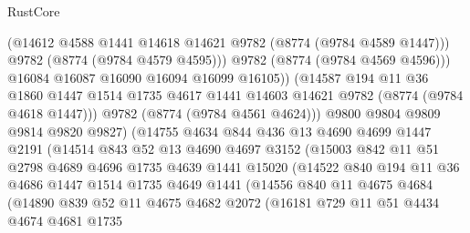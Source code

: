 \begin{lexlean}{RustCore}
\begin{coremodule}
                          (@14612 @4588 @1441 @14618 @14621 @9782 (@8774 (@9784 @4589 @1447)))
                          @9782
                          (@8774 (@9784 @4579 @4595)))
                        @9782
                        (@8774 (@9784 @4569 @4596)))
                      @16084
                      @16087
                      @16090
                      @16094
                      @16099
                      @16105))
                  (@14587
                    @194
                    @11
                    @36
                    @1860
                    @1447
                    @1514
                    @1735
                    @4617
                    @1441
                    @14603
                    @14621
                    @9782
                    (@8774 (@9784 @4618 @1447)))
                  @9782
                  (@8774 (@9784 @4561 @4624)))
                @9800
                @9804
                @9809
                @9814
                @9820
                @9827)
              (@14755
                @4634
                @844
                @436
                @13
                @4690
                @4699
                @1447
                @2191
                (@14514
                  @843
                  @52
                  @13
                  @4690
                  @4697
                  @3152
                  (@15003
                    @842
                    @11
                    @51
                    @2798
                    @4689
                    @4696
                    @1735
                    @4639
                    @1441
                    @15020
                    (@14522
                      @840
                      @194
                      @11
                      @36
                      @4686
                      @1447
                      @1514
                      @1735
                      @4649
                      @1441
                      (@14556
                        @840
                        @11
                        @4675
                        @4684
                        (@14890
                          @839
                          @52
                          @11
                          @4675
                          @4682
                          @2072
                          (@16181
                            @729
                            @11
                            @51
                            @4434
                            @4674
                            @4681
                            @1735

\end{coremodule}
\end{lexlean}
